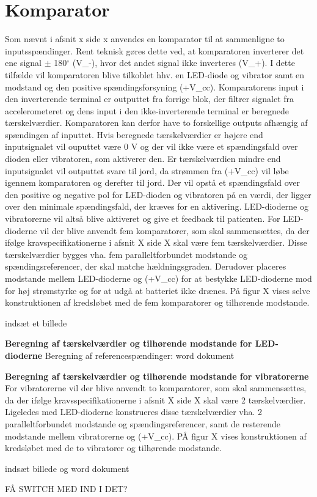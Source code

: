 \section{Komparator}
Som nævnt i afsnit x side x anvendes en komparator til at sammenligne to inputsspændinger. Rent teknisk gøres dette ved, at komparatoren inverterer det ene signal $\pm$ 180$^{\circ}$ (V_{-}), hvor det andet signal ikke inverteres (V_{+}). I dette tilfælde vil komparatoren blive tilkoblet hhv. en LED-diode og vibrator samt en modstand og den positive spændingsforsyning (+V_{cc}). Komparatorens input i den inverterende terminal er outputtet fra forrige blok, der filtrer signalet fra accelerometeret og dens input i den ikke-inverterende terminal er beregnede tærskelværdier. Komparatoren kan derfor have to forskellige outputs afhængig af spændingen af inputtet. Hvis beregnede tærskelværdier er højere end inputsignalet vil ouputtet være 0 V og der vil ikke være et spændingsfald over dioden eller vibratoren, som aktiverer den. Er tærskelværdien mindre end inputsignalet vil outputtet svare til jord, da strømmen fra (+V_{cc}) vil løbe igennem komparatoren og derefter til jord. Der vil opstå et spændingsfald over den positive og negative pol for LED-dioden og vibratoren på en værdi, der ligger over den minimale spændingsfald, der kræves for en aktivering. LED-dioderne og vibratorerne vil altså blive aktiveret og give et feedback til patienten. 
For LED-dioderne vil der blive anvendt fem komparatorer, som skal sammensættes, da der ifølge kravspecifikationerne i afsnit X side X skal være fem tærskelværdier. Disse tærskelværdier bygges vha. fem paralleltforbundet modstande og spændingsreferencer, der skal matche hældningsgraden. Derudover placeres modstande mellem LED-dioderne og (+V_{cc}) for at bestykke LED-dioderne mod for høj strømstyrke og for at udgå at batteriet ikke drænes. På figur X vises selve konstruktionen af kredsløbet med de fem komparatorer og tilhørende modstande.

indsæt et billede

\textbf{Beregning af tærskelværdier og tilhørende modstande for LED-dioderne}
Beregning af referencespændinger: 
word dokument

\textbf{Beregning af tærskelværdier og tilhørende modstande for vibratorerne}
For vibratorerne vil der blive anvendt to komparatorer, som skal sammensættes, da der ifølge kravsspecifikationerne i afsnit X side X skal være 2 tærskelværdier. Ligeledes med LED-dioderne konstrueres disse tærskelværdier vha. 2 paralleltforbundet modstande og spændingsreferencer, samt de resterende modstande mellem vibratorerne og (+V_{cc}). PÅ figur X vises konstruktionen af kredsløbet med de to vibratorer og tilhørende modstande.

indsæt billede og word dokument



FÅ SWITCH MED IND I DET? 